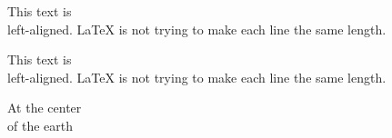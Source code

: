 \documentclass[UTF8]{article}
\begin{document}
\begin{flushleft}
This text is\\ left-aligned.
\LaTeX{} is not trying to make 
each line the same length.
\end{flushleft}

\begin{flushright}
This text is\\ left-aligned.
\LaTeX{} is not trying to make 
each line the same length.
\end{flushright}

\begin{center}
At the center\\of the earth
\end{center}
\end{document}
